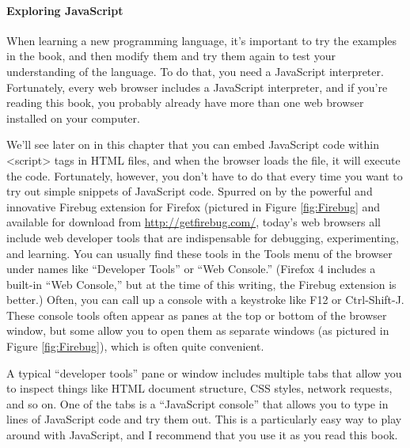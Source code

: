 \paragraph*{Exploring JavaScript}
\hfill \break
When learning a new programming language, it’s important to try the examples in the
book, and then modify them and try them again to test your understanding of the
language. To do that, you need a JavaScript interpreter. Fortunately, every web browser
includes a JavaScript interpreter, and if you’re reading this book, you probably already
have more than one web browser installed on your computer.

We’ll see later on in this chapter that you can embed JavaScript code within <script>
tags in HTML files, and when the browser loads the file, it will execute the code. Fortunately,
however, you don’t have to do that every time you want to try out simple
snippets of JavaScript code. Spurred on by the powerful and innovative Firebug extension
for Firefox (pictured in Figure \ref{fig:Firebug} and available for download from \href{http://getfirebug.com/}{http://getfirebug.com/}, today’s web browsers all include web developer tools that are indispensable for
debugging, experimenting, and learning. You can usually find these tools in the Tools
menu of the browser under names like “Developer Tools” or “Web Console.”
(Firefox 4 includes a built-in “Web Console,” but at the time of this writing, the Firebug
extension is better.) Often, you can call up a console with a keystroke like F12 or Ctrl-Shift-J.
These console tools often appear as panes at the top or bottom of the browser
window, but some allow you to open them as separate windows (as pictured in Figure
\ref{fig:Firebug}), which is often quite convenient.


A typical “developer tools” pane or window includes multiple tabs that allow you to
inspect things like HTML document structure, CSS styles, network requests, and so
on. One of the tabs is a “JavaScript console” that allows you to type in lines of JavaScript
code and try them out. This is a particularly easy way to play around with JavaScript,
and I recommend that you use it as you read this book.

